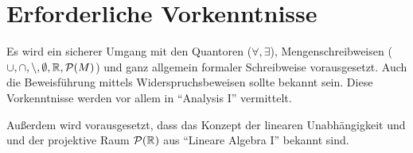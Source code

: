 \section*{Erforderliche Vorkenntnisse}
Es wird ein sicherer Umgang mit den Quantoren ($\forall, \exists$),
Mengenschreibweisen ($\cup, \cap, \setminus, \emptyset, \mathbb{R}, \mathcal{P}(M)$)
und ganz allgemein formaler Schreibweise vorausgesetzt. Auch die
Beweisführung mittels Widerspruchsbeweisen sollte bekannt sein.
Diese Vorkenntnisse werden vor allem in \enquote{Analysis I} vermittelt.

Außerdem wird vorausgesetzt, dass das Konzept der linearen Unabhängigkeit
und und der projektive Raum $\mathcal{P}(\mathbb{R})$ aus \enquote{Lineare Algebra I}
bekannt sind.
